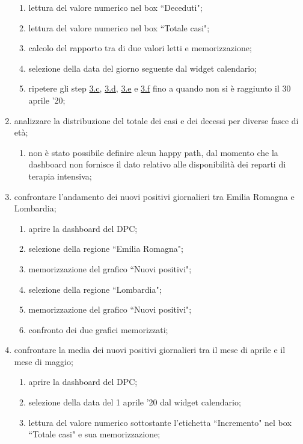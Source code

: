 \begin{enumerate}
\begin{enumerate}[label=\alph*.]
        \item lettura del valore numerico nel box ``Deceduti"; \label{taa:c}
        \item lettura del valore numerico nel box ``Totale casi"; \label{taa:d}
        \item calcolo del rapporto tra di due valori letti e memorizzazione; \label{taa:e}
        \item selezione della data del giorno seguente dal widget calendario; \label{taa:f}
        \item ripetere gli step \hyperref[taa:c]{3.c}, \hyperref[taa:d]{3.d}, \hyperref[taa:e]{3.e} e \hyperref[taa:f]{3.f} fino a quando non si è raggiunto il 30 aprile '20;
    \end{enumerate}
    \item analizzare la distribuzione del totale dei casi e dei decessi per diverse fasce di età;
    \begin{enumerate}[label=\alph*.]
        \item non è stato possibile definire alcun happy path, dal momento che la dashboard non fornisce il dato relativo alle disponibilità dei reparti di terapia intensiva;
    \end{enumerate}
    \item confrontare l'andamento dei nuovi positivi giornalieri tra Emilia Romagna e Lombardia;
    \begin{enumerate}[label=\alph*.]
        \item aprire la dashboard del DPC;
        \item selezione della regione ``Emilia Romagna";
        \item memorizzazione del grafico ``Nuovi positivi";
        \item selezione della regione ``Lombardia";
        \item memorizzazione del grafico ``Nuovi positivi";
        \item confronto dei due grafici memorizzati;
    \end{enumerate}
    \item confrontare la media dei nuovi positivi giornalieri tra il mese di aprile e il mese di maggio;
    \begin{enumerate}[label=\alph*.]
        \item aprire la dashboard del DPC;
        \item selezione della data del 1 aprile '20 dal widget calendario; \label{at:b}
        \item lettura del valore numerico sottostante l'etichetta ``Incremento" nel box ``Totale casi" e sua memorizzazione; \label{at:c}

\end{enumerate}
\end{enumerate}
